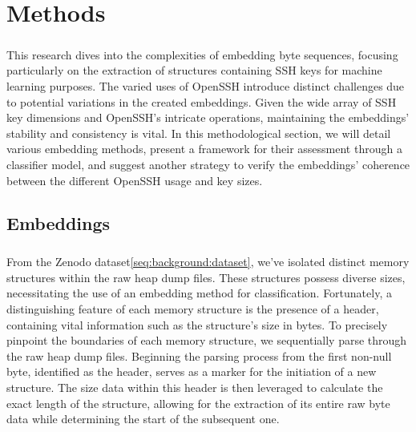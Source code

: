 \chapter{Methods}\label{chap:methods}
    \paragraph{}This research dives into the complexities of embedding byte sequences, focusing particularly on the extraction of structures containing SSH keys for machine learning purposes. The varied uses of OpenSSH introduce distinct challenges due to potential variations in the created embeddings. Given the wide array of SSH key dimensions and OpenSSH's intricate operations, maintaining the embeddings' stability and consistency is vital. In this methodological section, we will detail various embedding methods, present a framework for their assessment through a classifier model, and suggest another strategy to verify the embeddings' coherence between the different OpenSSH usage and key sizes.

    
    \section{Embeddings}
    \paragraph{}From the Zenodo dataset\ref{seq:background:dataset}, we've isolated distinct memory structures within the raw heap dump files. These structures possess diverse sizes, necessitating the use of an embedding method for classification. Fortunately, a distinguishing feature of each memory structure is the presence of a header, containing vital information such as the structure's size in bytes. To precisely pinpoint the boundaries of each memory structure, we sequentially parse through the raw heap dump files. Beginning the parsing process from the first non-null byte, identified as the header, serves as a marker for the initiation of a new structure. The size data within this header is then leveraged to calculate the exact length of the structure, allowing for the extraction of its entire raw byte data while determining the start of the subsequent one.
    
